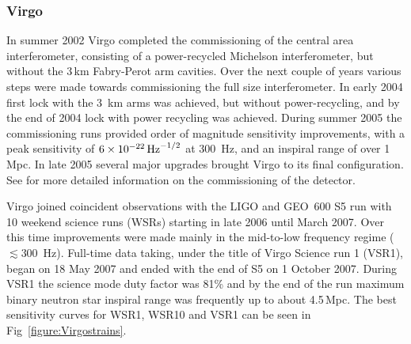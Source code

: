 \documentclass{article}
\begin{document}
\subsubsection{Virgo}
In summer 2002 Virgo completed the commissioning of the central area
interferometer, consisting of a power-recycled Michelson interferometer, but
without the 3\,km Fabry-Perot arm cavities. Over the next couple of years
various steps were made towards commissioning the full size interferometer. In
early 2004 first lock with the 3~km arms was achieved, but without
power-recycling, and by the end of 2004 lock with power recycling was achieved.
During summer 2005 the commissioning runs provided order of magnitude
sensitivity improvements, with a peak sensitivity of $6\times10^{-22}\,{\rm
Hz}^{-1/2}$ at 300~Hz, and an inspiral range of over 1\,Mpc. In late 2005
several major upgrades brought Virgo to its final configuration. See
\cite{Acernese:2004, Acernese:2005, Acernese:2006, Acernese:2007} for more
detailed information on the commissioning of the detector.

Virgo joined coincident observations with the LIGO and GEO~600 S5 run with 10
weekend science runs (WSRs) starting in late 2006 until March 2007. Over this
time improvements were made mainly in the mid-to-low frequency regime ($\lesssim
300$~Hz). Full-time data taking, under the title of Virgo Science run 1 (VSR1),
began on 18 May 2007 and ended with the end of S5 on 1 October 2007. During VSR1
the science mode duty factor was 81\% and by the end of the run maximum binary
neutron star inspiral range was frequently up to about 4.5\,Mpc. The best
sensitivity curves for WSR1, WSR10 and VSR1 can be seen in
Fig~\ref{figure:Virgostrains}.

\end{document}
